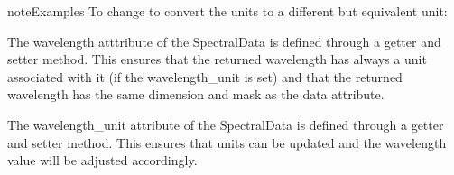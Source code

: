 \documentclass[a4paper,10pt,english]{sphinxmanual}
\begin{document}
\begin{fulllineitems}
\begin{sphinxadmonition}{note}{Examples}
To change to convert the units to a different but equivalent unit:

%
\begin{sphinxVerbatim}[commandchars=\\\{\}]
  
  
 
\end{sphinxVerbatim}
\end{sphinxadmonition}

\begin{fulllineitems}
\label{\detokenize{cascade.data_model:cascade.data_model.data_model.SpectralData.wavelength}}
The wavelength atttribute of the SpectralData is defined
through a getter and setter method. This ensures that the
returned wavelength has always a unit associated with it (if the
wavelength\_unit is set) and that the returned  wavelength has the same
dimension and mask as the data attribute.

\end{fulllineitems}


\begin{fulllineitems}
\label{\detokenize{cascade.data_model:cascade.data_model.data_model.SpectralData.wavelength_unit}}
The wavelength\_unit attribute of the SpectralData is defined
through a getter and setter method. This ensures that units can be
updated and the wavelength value will be adjusted accordingly.

\end{fulllineitems}



\end{fulllineitems}
\end{document}
